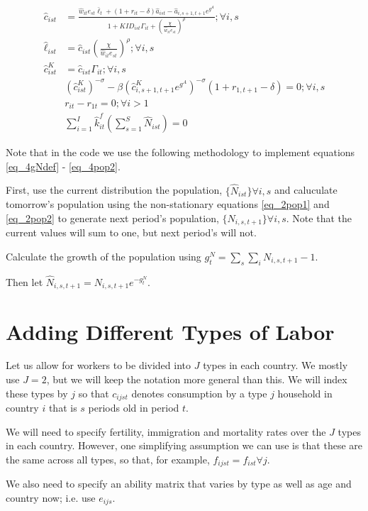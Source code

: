 \documentclass[letterpaper,12pt]{article}
\theoremstyle{definition}
\numberwithin{equation}{section}
\begin{document}
\begin{spacing}{1.5}
\begin{align}
    	\hat c_{ist} & = \frac{\hat w_{it} e_{st} \bar \ell_t + (1+r_{it}-\delta)\hat a_{ist} - \hat a_{i,s+1,t+1} e^{g^A}} {1 + KID_{ist}\Gamma_{it} + \left(\tfrac{\chi}{\hat w_{it}e_{st}}\right)^\rho}; \forall i,s \\
		\hat \ell_{ist} & = \hat c_{ist} \left(\frac{\chi}{\hat w_{it}e_{st}}\right)^\rho ; \forall i,s \\
		\hat c^K_{ist} & = \hat c_{ist} \Gamma_{it}; \forall i,s \\
		& \left({\hat c^K_{ist}}\right)^{-\sigma} - \beta \left(\hat c^K_{i,s+1,t+1} e^{g^A}\right)^{-\sigma}(1+r_{1,t+1}-\delta) = 0; \forall i,s \\
		& r_{it} - r_{1t} = 0; \forall i>1 \\
		& \sum_{i=1}^I \hat k^f_{it} \left( \sum_{s=1}^S \hat N_{ist} \right) = 0
	\end{align}

	Note that in the code we use the following methodology to implement equations \eqref{eq_4gNdef} - \eqref{eq_4pop2}.

	First, use the current distribution the population, $\{\hat N_{ist}\} \forall i, s$ and caluculate tomorrow's population using the non-stationary equations \eqref{eq_2pop1} and \eqref{eq_2pop2} to generate next period's population, $\{N_{i,s,t+1}\} \forall i, s$.  Note that the current values will sum to one, but next period's will not.

	Calculate the growth of the population using $g^N_t = \sum_s \sum_i N_{i,s,t+1} - 1$.

	Then let $\hat N_{i,s,t+1} = N_{i,s,t+1} e^{-g^N_t}$.


\newpage
\section{Adding Different Types of Labor}
	Let us allow for workers to be divided into $J$ types in each country.  We mostly use $J=2$, but we will keep the notation more general than this.  We will index these types by $j$ so that $c_{ijst}$ denotes consumption by a type $j$ household in country $i$ that is $s$ periods old in period $t$.

	We will need to specify fertility, immigration and mortality rates over the $J$ types in each country.  However, one simplifying assumption we can use is that these are the same across all types, so that, for example, $f_{ijst} = f_{ist} \forall j$.

	We also need to specify an ability matrix that varies by type as well as age and country now; i.e. use $e_{ijs}$.


\end{spacing}
\end{document}
